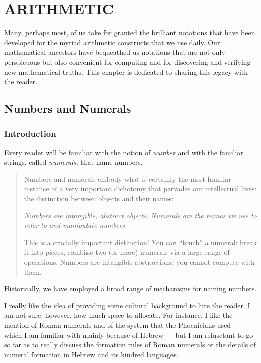 
\chapter{ARITHMETIC}
\label{ch:arithmetic}

Many, perhaps most, of us take for granted the brilliant notations
that have been developed for the myriad arithmetic constructs that we
use daily.  Our mathematical ancestors have bequeathed us notations
that are not only perspicuous but also convenient for computing and
for discovering and verifying new mathematical truths.  This chapter
is dedicated to sharing this legacy with the reader.

\section{Numbers and Numerals}
\label{sec:numbers-numerals}

\subsection{Introduction}

Every reader will be familiar with the notion of {\it number} and with
the familiar strings, called {\it numerals}, that name numbers.
\begin{quote}
Numbers and numerals embody what is certainly the most familiar
instance of a very important dichotomy that pervades our intellectual
lives: the distinction between objects and their names:

{\em Numbers are intangible, abstract objects.  Numerals are the names
  we use to refer to and manipulate numbers.}

This is a crucially important distinction!  You can ``touch'' a
numeral: break it into pieces, combine two (or more) numerals via a
large range of operations.  Numbers are intangible abstractions: you
cannot compute with them.
\end{quote}
Historically, we have employed a broad range of mechanisms for naming
numbers.

{\Arny I really like the idea of providing some cultural background to
  lure the reader.  I am not sure, however, how much space to
  allocate.  For instance, I like the mention of Roman numerals and of
  the system that the Phoenicians used --- which I am familiar with
  mainly because of Hebrew --- but I am relusctant to go so far as to
  really discuss the formation rules of Roman numerals or the details
  of numeral formation in Hebrew and its kindred languages.}

